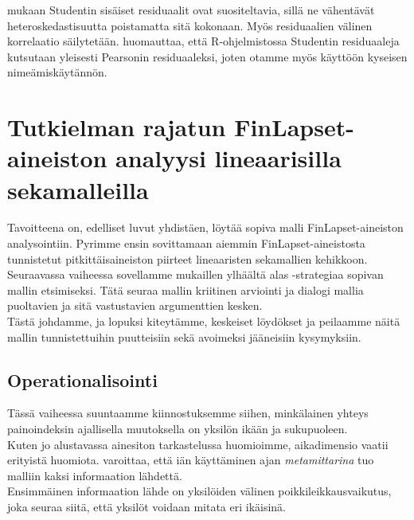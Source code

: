 \documentclass[finnish]{docopts}
\begin{document}
 \cite{burzykowski13} mukaan Studentin sisäiset residuaalit ovat suositeltavia, sillä ne vähentävät heteroskedastisuutta poistamatta sitä kokonaan. Myös residuaalien välinen korrelaatio säilytetään. \cite{burzykowski13} huomauttaa, että R-ohjelmistossa Studentin residuaaleja kutsutaan yleisesti Pearsonin residuaaleksi, joten otamme myös käyttöön kyseisen nimeämiskäytännön.\\
 
\section{Tutkielman rajatun FinLapset-aineiston analyysi lineaarisilla sekamalleilla}
\label{sec:lsmanalyysi}

Tavoitteena on, edelliset luvut yhdistäen, löytää sopiva malli FinLapset-aineiston analysointiin. Pyrimme ensin sovittamaan aiemmin FinLapset-aineistosta tunnistetut pitkittäisaineiston piirteet lineaaristen sekamallien kehikkoon.\\

Seuraavassa vaiheessa sovellamme \cite{west14, verbeke00} mukaillen ylhäältä alas -strategiaa sopivan mallin etsimiseksi. Tätä seuraa mallin kriitinen arviointi ja dialogi mallia puoltavien ja sitä vastustavien argumenttien kesken.\\

Tästä johdamme, ja lopuksi kiteytämme, keskeiset löydökset ja peilaamme näitä mallin tunnistettuihin puutteisiin sekä avoimeksi jääneisiin kysymyksiin.\\

\subsection{Operationalisointi}
\label{sub:operationalisointi}

Tässä vaiheessa suuntaamme kiinnostuksemme siihen, minkälainen yhteys painoindeksin ajallisella muutoksella on yksilön ikään ja sukupuoleen.\\

Kuten jo alustavassa ainesiton tarkastelussa huomioimme, aikadimensio vaatii erityistä huomiota. \cite{fitzmaurice11} varoittaa, että iän käyttäminen ajan \textit{metamittarina} tuo malliin kaksi informaation lähdettä.\\

Ensimmäinen informaation lähde on yksilöiden välinen poikkileikkausvaikutus, joka seuraa siitä, että yksilöt voidaan mitata eri ikäisinä.\\
\end{document}
